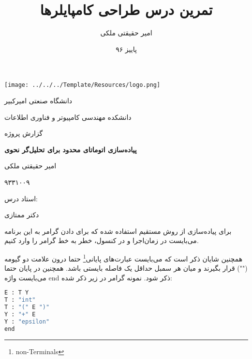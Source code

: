 \documentclass{report}
\title{تمرین درس طراحی کامپایلرها}
\author{امیر حقیقتی ملکی}
\date{پاییز ۹۶}
\theoremstyle{definition}
\begin{document}
		\begin{titlepage}
		\centering
		\texttt{[image: ../../../Template/Resources/logo.png]}\par\vspace{1cm}
		{\scshape\LARGE دانشگاه صنعتی امیرکبیر \par}
		{\scshape\LARGE دانشکده مهندسی کامپیوتر و فناوری اطلاعات \par}
		\vspace{1cm}
		{\scshape\Large
	گزارش پروژه
			\par}
		\vspace{1.5cm}
		{\huge\bfseries 
			پیاده‌سازی اتوماتای محدود برای تحلیل‌گر نحوی
			\par}
		\vspace{2cm}
		{\Large امیر حقیقتی ملکی \par}
		{\Large ۹۳۳۱۰۰۹\par}
		\vfill
		استاد درس:\par
		دکتر ممتازی
		\vfill
		
		{\large {}\par}
	\end{titlepage}
	\newpage
	برای پیاده‌سازی از روش مستقیم استفاده شده که برای دادن گرامر به این برنامه می‌بایست در زمان‌اجرا و در کنسول، خطر به خط گرامر را وارد کنیم.
	
	همچنین شایان ذکر است که می‌بایست عبارت‌های پایانی\footnote{non-Terminals} حتما درون علامت دو گیومه ("") قرار بگیرند و میان هر سمبل حداقل یک فاصله بایستی باشد. همچنین در پایان حتما می‌بایست واژه end ذکر شود.
	نمونه گرامر در زیر ذکر شده:
	
	\begin{latin}
		\begin{lstlisting}[language=bash]
E : T Y
T : "int"
T : "(" E ")"
Y : "+" E
Y : "epsilon"
end
\end{lstlisting}
	\end{latin}
\end{document}
